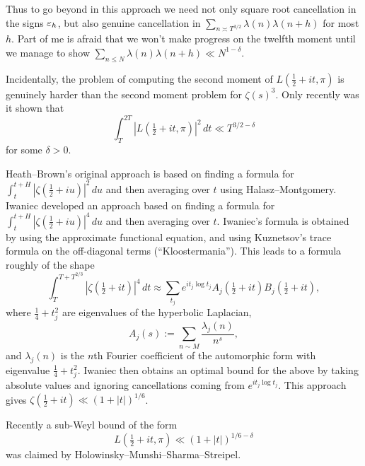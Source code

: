 \documentclass[reqno]{amsart} 
\numberwithin{theorem}{section}
\numberwithin{equation}{section}
\begin{document}
Thus to go beyond in this approach we need not only square root cancellation in the signs $\varepsilon_h$, but also genuine cancellation in $\sum_{n \asymp T^{3/2}} \lambda(n) \lambda(n + h)$ for most $h$.  Part of me is afraid that we won't make progress on the twelfth moment until we manage to show $\sum_{n \leq N} \lambda(n) \lambda(n + h) \ll N^{1 - \delta}$.

Incidentally, the problem of computing the second moment of $L(\tfrac{1}{2} + i t, \pi)$ is genuinely harder than the second moment problem for $\zeta(s)^3$.  Only recently was it shown that
\begin{equation*}
  \int_{T}^{2 T} \left\lvert L(\tfrac{1}{2} + i t, \pi) \right\rvert^2 \, d t \ll T^{3/2 - \delta}
\end{equation*}
for some $\delta > 0$.

Heath--Brown's original approach is based on finding a formula for $\int_t^{t + H} \left\lvert \zeta(\tfrac{1}{2} + i u) \right\rvert^2 \, d u$ and then averaging over $t$ using Halasz--Montgomery.  Iwaniec developed an approach based on finding a formula for $\int_t^{t + H} \left\lvert \zeta(\tfrac{1}{2} + i u) \right\rvert^4 \, d u$ and then averaging over $t$.  Iwaniec's formula is obtained by using the approximate functional equation, and using Kuznetsov's trace formula on the off-diagonal terms (``Kloostermania'').  This leads to a formula roughly of the shape
\begin{equation*}
  \int_{T}^{T + T^{2/3}}
  \left\lvert \zeta(\tfrac{1}{2} + i t) \right\rvert^4 \, d t
  \approx \sum_{t_j} e^{i t_j \log t_j} A_j(\tfrac{1}{2} + i t) B_j(\tfrac{1}{2} + i t),
\end{equation*}
where $\tfrac{1}{4} + t_j^2$ are eigenvalues of the hyperbolic Laplacian,
\begin{equation*}
  A_j(s) := \sum_{n \sim M} \frac{\lambda_j(n)}{n^s},
\end{equation*}
and $\lambda_j(n)$ is the $n$th Fourier coefficient of the automorphic form with eigenvalue $\tfrac{1}{4} + t_j^2$.  Iwaniec then obtains an optimal bound for the above by taking absolute values and ignoring cancellations coming from $e^{i t_j \log t_j}$.  This approach gives $\zeta(\tfrac{1}{2} + i t) \ll(1 + \lvert t \rvert)^{1/6}$.

Recently a sub-Weyl bound of the form
\begin{equation*}
  L(\tfrac{1}{2} + i t, \pi) \ll(1 + \lvert t \rvert)^{1/6 - \delta}
\end{equation*}
was claimed by Holowinsky--Munshi--Sharma--Streipel.
\end{document}
